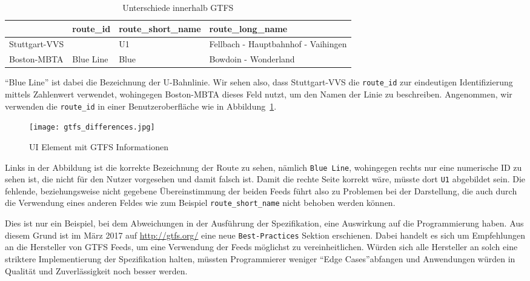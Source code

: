         \begin{longtable}{|>{\raggedright \arraybackslash}p{3.0cm}|>{\raggedright \arraybackslash}p{2.0cm}|>{\raggedright \arraybackslash}p{3.5cm}|>{\raggedright \arraybackslash}p{5.5cm}|}
        \caption{Unterschiede innerhalb GTFS} 
        \label{table:gtfs_differences}\\
          \hline
           & route\_id & route\_short\_name & route\_long\_name\\
          \hline
          Stuttgart-VVS & 379 & U1 & Fellbach - Hauptbahnhof - Vaihingen\\
          \hline
          Boston-MBTA & Blue Line & Blue & Bowdoin - Wonderland\\
          \hline
        \end{longtable}

        "`Blue Line"' ist dabei die Bezeichnung der U-Bahnlinie\parencite{wiki_blue_line}. Wir sehen also, dass Stuttgart-VVS die \texttt{route\_id} zur eindeutigen Identifizierung mittels Zahlenwert verwendet, wohingegen Boston-MBTA dieses Feld nutzt, um den Namen der Linie zu beschreiben. Angenommen, wir verwenden die \texttt{route\_id} in einer Benutzeroberfläche wie in Abbildung~\ref{fig:gtfs_differences}.

        \begin{figure}[htbp]
          \begin{center}
            \texttt{[image: gtfs\_differences.jpg]}
            \caption{UI Element mit GTFS Informationen}
            \label{fig:gtfs_differences}
          \end{center}
        \end{figure}

        Links in der Abbildung ist die korrekte Bezeichnung der Route zu sehen, nämlich \texttt{Blue Line}, wohingegen rechts nur eine numerische ID zu sehen ist, die nicht für den Nutzer vorgesehen und damit falsch ist. Damit die rechte Seite korrekt wäre, müsste dort \texttt{U1} abgebildet sein. Die fehlende, beziehungsweise nicht gegebene Übereinstimmung der beiden Feeds führt also zu Problemen bei der Darstellung, die auch durch die Verwendung eines anderen Feldes wie zum Beispiel \texttt{route\_short\_name} nicht behoben werden können. 

        Dies ist nur ein Beispiel, bei dem Abweichungen in der Ausführung der Spezifikation, eine Auswirkung auf die Programmierung haben. Aus diesem Grund ist im März 2017 auf \url{http://gtfs.org/} eine neue \texttt{Best-Practices} Sektion erschienen. Dabei handelt es sich um Empfehlungen an die Hersteller von GTFS Feeds, um eine Verwendung der Feeds möglichst zu vereinheitlichen. Würden sich alle Hersteller an solch eine striktere Implementierung der Spezifikation halten, müssten Programmierer weniger "`Edge Cases"'\footnotemark abfangen und Anwendungen würden in Qualität und Zuverlässigkeit noch besser werden.\\

